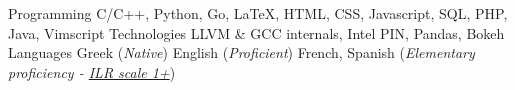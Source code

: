 

\begin{cvskills}

  \cvskill
    {Programming}
        {C/C++, Python, Go, \LaTeX, HTML, CSS, Javascript, SQL, PHP, Java, Vimscript}
  \cvskill
    {Technologies} %
		{LLVM \& GCC internals, Intel PIN, Pandas, Bokeh} %
  \cvskill
    {Languages} %
    {Greek (\textit{Native}) \hspace*{7pt} English (\textit{Proficient}) \hspace*{7pt}  French, Spanish (\textit{Elementary proficiency - \href{http://www.govtilr.org/skills/ILRscale1.htm}{ILR scale 1+}})}

\end{cvskills}
